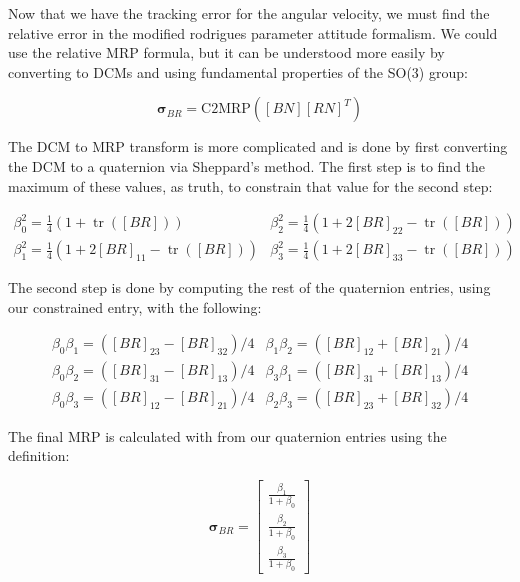 \documentclass[paper]{aiaaNew}
\begin{document}
Now that we have the tracking error for the angular velocity, we must find the relative error in the modified rodrigues parameter attitude formalism. We could use the relative MRP formula, but it can be understood more easily by converting to DCMs and using fundamental properties of the SO(3) group: 

\begin{equation}
  \bm{\sigma}_{BR} = \text{C2MRP}([BN][RN]^T)
\end{equation}

The DCM to MRP transform is more complicated and is done by first converting the DCM to a quaternion via Sheppard's method. The first step is to find the maximum of these values, as truth, to constrain that value for the second step:

\begin{equation}
  \begin{array}{ll}{\beta_{0}^{2}=\frac{1}{4}(1+\operatorname{tr}([BR]))} & {\beta_{2}^{2}=\frac{1}{4}\left(1+2 [BR]_{22}-\operatorname{tr}([BR])\right)} \\ {\beta_{1}^{2}=\frac{1}{4}\left(1+2 [BR]_{11}-\operatorname{tr}([BR])\right)} & {\beta_{3}^{2}=\frac{1}{4}\left(1+2 [BR]_{33}-\operatorname{tr}([BR])\right)}\end{array}
\end{equation}

The second step is done by computing the rest of the quaternion entries, using our constrained entry, with the following: 

\begin{equation}
  \begin{array}{ll}{\beta_{0} \beta_{1}=\left([BR]_{23}-[BR]_{32}\right) / 4} & {\beta_{1} \beta_{2}=\left([BR]_{12}+[BR]_{21}\right) / 4} \\ {\beta_{0} \beta_{2}=\left([BR]_{31}-[BR]_{13}\right) / 4} & {\beta_{3} \beta_{1}=\left([BR]_{31}+[BR]_{13}\right) / 4} \\ {\beta_{0} \beta_{3}=\left([BR]_{12}-[BR]_{21}\right) / 4} & {\beta_{2} \beta_{3}=\left([BR]_{23}+[BR]_{32}\right) / 4}\end{array}
\end{equation}

The final MRP is calculated with from our quaternion entries using the definition:

\begin{equation}
  \bm{\sigma}_{BR} = \begin{bmatrix}
  \frac{\beta_1}{1+\beta_0} \\
  \frac{\beta_2}{1+\beta_0} \\
  \frac{\beta_3}{1+\beta_0} 
  \end{bmatrix}
\end{equation}
\end{document}
